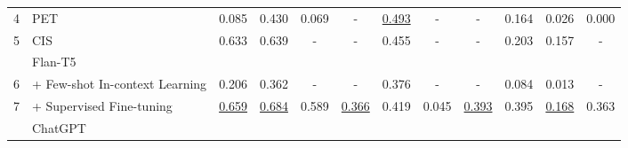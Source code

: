 \begin{table*}[t]
{\begin{tabular}{clcccccccccc}
\multicolumn{1}{c|}{4}                             & \multicolumn{1}{l|}{PET~\cite{bellan2023pet}}                             & \multicolumn{1}{c|}{0.085}                           & \multicolumn{1}{c|}{0.430}                            & 0.069          & \multicolumn{1}{c|}{-}               & \underline{0.493}              & -                  & \multicolumn{1}{c|}{-}                 & 0.164             & 0.026              & 0.000                    \\ \cline{2-12} 
\multicolumn{1}{c|}{5}                            & \multicolumn{1}{l|}{CIS~\cite{bellan2022leveraging}}                             & \multicolumn{1}{c|}{0.633}                           & \multicolumn{1}{c|}{0.639}                            & -              & \multicolumn{1}{c|}{-}               & 0.455              & -                  & \multicolumn{1}{c|}{-}                 & 0.203             & 0.157              & -                   \\ \hline
\multicolumn{1}{l|}{}                              & \multicolumn{1}{l|}{Flan-T5~\cite{chung2022scaling}}                         & \multicolumn{1}{c|}{}                                & \multicolumn{1}{c|}{}                                 &                & \multicolumn{1}{c|}{}                &                    &                    & \multicolumn{1}{c|}{}                  &                   &                    &                     \\
\multicolumn{1}{c|}{6}                             & \multicolumn{1}{l|}{\quad + Few-shot In-context Learning}               & \multicolumn{1}{c|}{0.206}                           & \multicolumn{1}{c|}{0.362}                            & -              & \multicolumn{1}{c|}{-}               & 0.376              & -                  & \multicolumn{1}{c|}{-}                 & 0.084             & 0.013              & -                   \\
\multicolumn{1}{c|}{7}                             & \multicolumn{1}{l|}{\quad + Supervised Fine-tuning}                     & \multicolumn{1}{c|}{\underline{0.659}}                           & \multicolumn{1}{c|}{\underline{0.684}}                            & 0.589          & \multicolumn{1}{c|}{\underline{0.366}}           & 0.419              & 0.045              & \multicolumn{1}{c|}{\underline{0.393}}             & 0.395             & \underline{0.168}              & 0.363               \\ \hline
\multicolumn{1}{l|}{}                             & \multicolumn{1}{l|}{ChatGPT~\cite{ouyang2022training}}                         &  \multicolumn{1}{c|}{}                                 & \multicolumn{1}{c|}{}                                 &                & \multicolumn{1}{c|}{}                &                    &                    & \multicolumn{1}{c|}{}                  &                   &                    &                     \\


\end{tabular}}
\end{table*}
